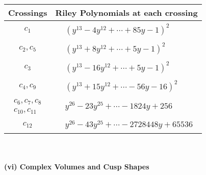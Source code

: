 \documentclass[1p]{elsarticle_modified}
\theoremstyle{definition}
\begin{document}
\begin{tabular}{m{50pt}|m{274pt}}
Crossings & \hspace{64pt}Riley Polynomials at each crossing \\
\hline $$\begin{aligned}c_{1}\end{aligned}$$&$\begin{aligned}
&(y^{13}-4 y^{12}+\cdots+85 y-1)^{2}
\end{aligned}$\\
\hline $$\begin{aligned}c_{2},c_{5}\end{aligned}$$&$\begin{aligned}
&(y^{13}+8 y^{12}+\cdots+5 y-1)^{2}
\end{aligned}$\\
\hline $$\begin{aligned}c_{3}\end{aligned}$$&$\begin{aligned}
&(y^{13}-16 y^{12}+\cdots+5 y-1)^{2}
\end{aligned}$\\
\hline $$\begin{aligned}c_{4},c_{9}\end{aligned}$$&$\begin{aligned}
&(y^{13}+15 y^{12}+\cdots-56 y-16)^{2}
\end{aligned}$\\
\hline $$\begin{aligned}c_{6},c_{7},c_{8}\\c_{10},c_{11}\end{aligned}$$&$\begin{aligned}
&y^{26}-23 y^{25}+\cdots-1824 y+256
\end{aligned}$\\
\hline $$\begin{aligned}c_{12}\end{aligned}$$&$\begin{aligned}
&y^{26}-43 y^{25}+\cdots-2728448 y+65536
\end{aligned}$\\
\hline
\end{tabular}\\~\\
\newpage\flushleft \textbf{(vi) Complex Volumes and Cusp Shapes}
\end{document}

